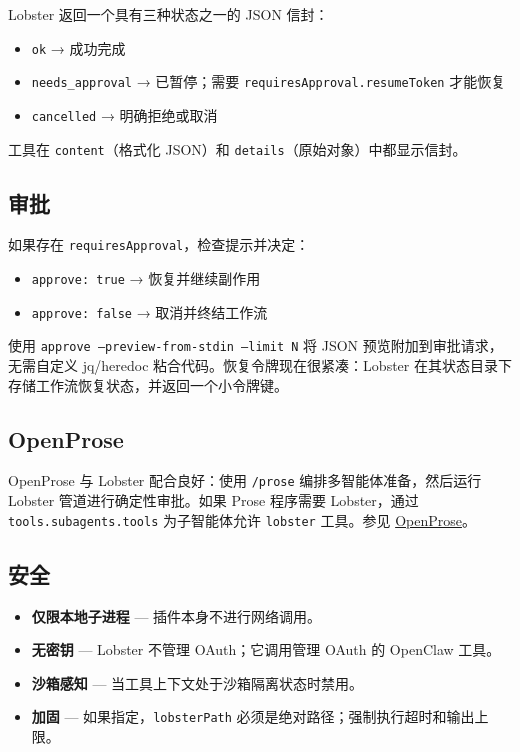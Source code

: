 Lobster 返回一个具有三种状态之一的 JSON 信封：

\begin{itemize}
  \item \texttt{ok} → 成功完成
  \item \texttt{needs\_approval} → 已暂停；需要 \texttt{requiresApproval.resumeToken} 才能恢复
  \item \texttt{cancelled} → 明确拒绝或取消
\end{itemize}


工具在 \texttt{content}（格式化 JSON）和 \texttt{details}（原始对象）中都显示信封。

\subsection{审批}


如果存在 \texttt{requiresApproval}，检查提示并决定：

\begin{itemize}
  \item \texttt{approve: true} → 恢复并继续副作用
  \item \texttt{approve: false} → 取消并终结工作流
\end{itemize}


使用 \texttt{approve --preview-from-stdin --limit N} 将 JSON 预览附加到审批请求，无需自定义 jq/heredoc 粘合代码。恢复令牌现在很紧凑：Lobster 在其状态目录下存储工作流恢复状态，并返回一个小令牌键。

\subsection{OpenProse}


OpenProse 与 Lobster 配合良好：使用 \texttt{/prose} 编排多智能体准备，然后运行 Lobster 管道进行确定性审批。如果 Prose 程序需要 Lobster，通过 \texttt{tools.subagents.tools} 为子智能体允许 \texttt{lobster} 工具。参见 \href{/prose}{OpenProse}。

\subsection{安全}


\begin{itemize}
  \item \textbf{仅限本地子进程} — 插件本身不进行网络调用。
  \item \textbf{无密钥} — Lobster 不管理 OAuth；它调用管理 OAuth 的 OpenClaw 工具。
  \item \textbf{沙箱感知} — 当工具上下文处于沙箱隔离状态时禁用。
  \item \textbf{加固} — 如果指定，\texttt{lobsterPath} 必须是绝对路径；强制执行超时和输出上限。
\end{itemize}


